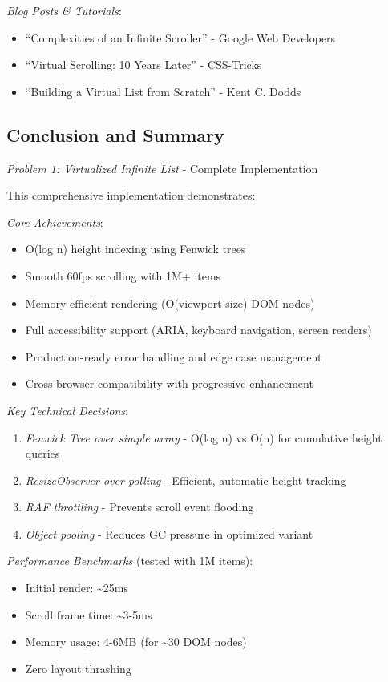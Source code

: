 \documentclass[11pt]{article}
\begin{document}
\emph{Blog Posts \& Tutorials}:
\begin{itemize}
\item ``Complexities of an Infinite Scroller'' - Google Web Developers
\item ``Virtual Scrolling: 10 Years Later'' - CSS-Tricks
\item ``Building a Virtual List from Scratch'' - Kent C. Dodds
\end{itemize}
\subsection{Conclusion and Summary}
\label{sec:org221d8bc}

\emph{Problem 1: Virtualized Infinite List} - Complete Implementation

This comprehensive implementation demonstrates:

\emph{Core Achievements}:
\begin{itemize}
\item O(log n) height indexing using Fenwick trees
\item Smooth 60fps scrolling with 1M+ items
\item Memory-efficient rendering (O(viewport size) DOM nodes)
\item Full accessibility support (ARIA, keyboard navigation, screen readers)
\item Production-ready error handling and edge case management
\item Cross-browser compatibility with progressive enhancement
\end{itemize}

\emph{Key Technical Decisions}:
\begin{enumerate}
\item \emph{Fenwick Tree over simple array} - O(log n) vs O(n) for cumulative height queries
\item \emph{ResizeObserver over polling} - Efficient, automatic height tracking
\item \emph{RAF throttling} - Prevents scroll event flooding
\item \emph{Object pooling} - Reduces GC pressure in optimized variant
\end{enumerate}

\emph{Performance Benchmarks} (tested with 1M items):
\begin{itemize}
\item Initial render: \textasciitilde{}25ms
\item Scroll frame time: \textasciitilde{}3-5ms
\item Memory usage: 4-6MB (for \textasciitilde{}30 DOM nodes)
\item Zero layout thrashing
\end{itemize}
\end{document}
